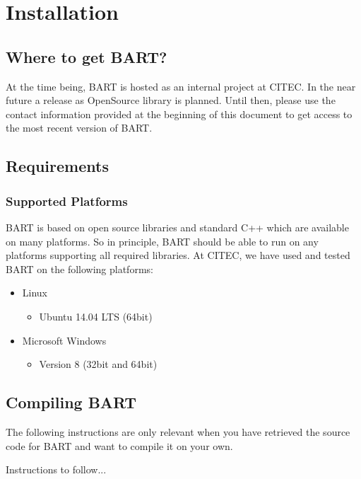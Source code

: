\chapter{Installation}

\section{Where to get BART?}

At the time being, BART is hosted as an internal project at CITEC. In the near future a release as OpenSource library is planned. Until then, please use the contact information provided at the beginning of this document to get access to the most recent version of BART.

\section{Requirements}

\subsection{Supported Platforms}

BART is based on open source libraries and standard C++ which are available on many platforms. So in principle, BART should be able to run on any platforms supporting all required libraries. At CITEC, we have used and tested BART on the following platforms:

\begin{itemize}
	\item Linux
	\begin{itemize}
		\item Ubuntu 14.04 LTS (64bit)
	\end{itemize}
	
	\item Microsoft Windows
	\begin{itemize}
		\item Version 8 (32bit and 64bit)
	\end{itemize}
	
\end{itemize}

\section{Compiling BART}

The following instructions are only relevant when you have retrieved the source code for BART and want to compile it on your own.

Instructions to follow...

